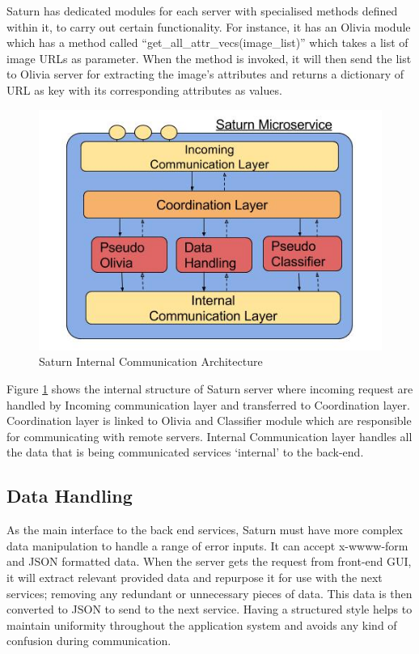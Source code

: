 Saturn has dedicated modules for each server with specialised methods defined within it, to carry out certain functionality. For instance, it has an Olivia module which has a method called ``get\_all\_attr\_vecs(image\_list)” which takes a list of image URLs as parameter. When the method is invoked, it will then send the list to Olivia server for extracting the image’s attributes and returns a dictionary of URL as key with its corresponding attributes as values.
\begin{figure}[H]
    \centering
    \includegraphics{figs/9/scl}
    \caption{Saturn Internal Communication Architecture}
    \label{fig:sat:scl}
\end{figure}
Figure \ref{fig:sat:scl} shows the internal structure of Saturn server where incoming request are handled by Incoming communication layer and transferred to Coordination layer. Coordination layer is linked to Olivia and Classifier module which are responsible for communicating with remote servers. Internal Communication layer handles all the data that is being communicated services `internal’ to the back-end.
\subsection{Data Handling}
As the main interface to the back end services, Saturn must have more complex data manipulation to handle a range of error inputs. It can accept x-wwww-form and JSON formatted data. When the server gets the request from front-end GUI, it will extract relevant provided data and repurpose it for use with the next services; removing any redundant or unnecessary pieces of data. This data is then converted to JSON to send to the next service. Having a structured style helps to maintain uniformity throughout the application system and avoids any kind of confusion during communication.

